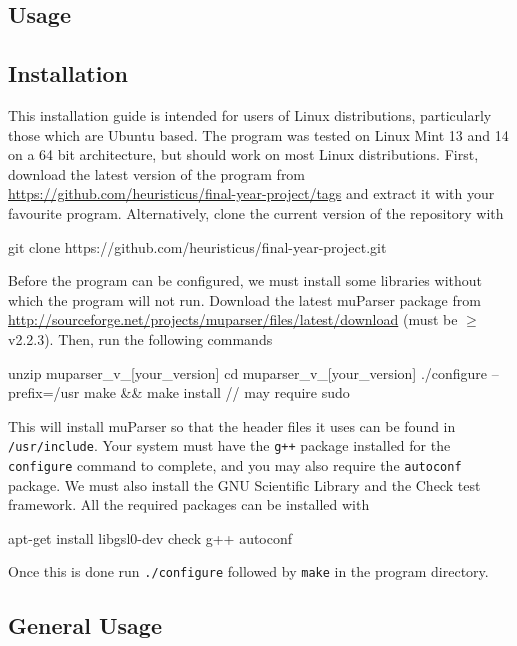 \documentclass[a4paper,11pt,twoside]{article}
\begin{document}
   \newpage
   \printbibliography
   \newpage
\begin{appendices}
\section{Usage}
\label{sec-10}
\subsection{Installation}
\label{sec-10-1}

   This installation guide is intended for users of Linux distributions,
   particularly those which are Ubuntu based. The program was tested on Linux
   Mint 13 and 14 on a 64 bit architecture, but should work on most Linux
   distributions. First, download the latest version of the program from
   \href{https://github.com/heuristicus/final-year-project/tags}{https://github.com/heuristicus/final-year-project/tags} and extract it with
   your favourite program. Alternatively, clone the current version of the
   repository with
   \begin{verbatimtab} 
     git clone https://github.com/heuristicus/final-year-project.git
   \end{verbatimtab}
   Before the program can be configured, we must install some libraries without
   which the program will not run. Download the latest muParser package from
   \href{http://sourceforge.net/projects/muparser/files/latest/download}{http://sourceforge.net/projects/muparser/files/latest/download} (must be
   $\geq$ v2.2.3). Then, run the following commands
   \begin{verbatimtab}
   unzip muparser_v_[your_version]
   cd muparser_v_[your_version]
   ./configure --prefix=/usr
   make && make install // may require sudo
   \end{verbatimtab}
   This will install muParser so that the header files it uses can be found in
   \texttt{/usr/include}. Your system must have the \texttt{g++} package
   installed for the \texttt{configure} command to complete, and you may also
   require the \texttt{autoconf} package. We must also install the GNU
   Scientific Library and the Check test framework. All the required packages
   can be installed with
   \begin{verbatimtab}
   apt-get install libgsl0-dev check g++ autoconf
   \end{verbatimtab}
   Once this is done run \texttt{./configure} followed by \texttt{make} in the
   program directory.
\subsection{General Usage}
\label{sec-10-2}


\end{appendices}
\end{document}
